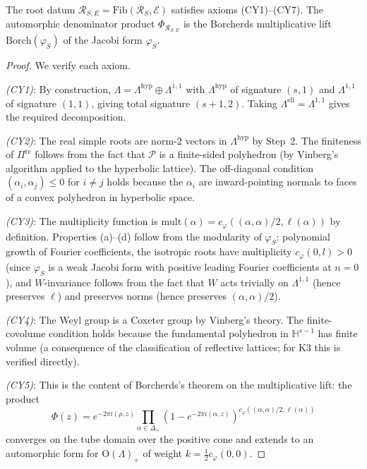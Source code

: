 \begin{theorem}
\label{thm:fibration-cy3}

The root datum $\mathcal{R}_{S,E} = \mathrm{Fib}(\mathcal{R}_S, \mathcal{E})$ satisfies axioms (CY1)--(CY7). The automorphic denominator product $\Phi_{\mathcal{R}_{S,E}}$ is the Borcherds multiplicative lift $\mathrm{Borch}(\varphi_S)$ of the Jacobi form $\varphi_S$.
\end{theorem}

\begin{proof}
We verify each axiom.

\emph{(CY1)}: By construction, $\Lambda = \Lambda^{\mathrm{hyp}} \oplus \Lambda^{1,1}$ with $\Lambda^{\mathrm{hyp}}$ of signature $(s,1)$ and $\Lambda^{1,1}$ of signature $(1,1)$, giving total signature $(s+1, 2)$. Taking $\Lambda^{\mathrm{ell}} = \Lambda^{1,1}$ gives the required decomposition.

\emph{(CY2)}: The real simple roots are norm-$2$ vectors in $\Lambda^{\mathrm{hyp}}$ by Step~2. The finiteness of $\Pi^{\mathrm{re}}$ follows from the fact that $\mathcal{P}$ is a finite-sided polyhedron (by Vinberg's algorithm applied to the hyperbolic lattice). The off-diagonal condition $(\alpha_i, \alpha_j) \leq 0$ for $i \neq j$ holds because the $\alpha_i$ are inward-pointing normals to faces of a convex polyhedron in hyperbolic space.

\emph{(CY3)}: The multiplicity function is $\mathrm{mult}(\alpha) = c_\varphi((\alpha,\alpha)/2, \ell(\alpha))$ by definition. Properties (a)--(d) follow from the modularity of $\varphi_S$: polynomial growth of Fourier coefficients, the isotropic roots have multiplicity $c_\varphi(0, l) > 0$ (since $\varphi_S$ is a weak Jacobi form with positive leading Fourier coefficients at $n = 0$), and $W$-invariance follows from the fact that $W$ acts trivially on $\Lambda^{1,1}$ (hence preserves $\ell$) and preserves norms (hence preserves $(\alpha,\alpha)/2$).

\emph{(CY4)}: The Weyl group is a Coxeter group by Vinberg's theory. The finite-covolume condition holds because the fundamental polyhedron in $\mathbb{H}^{s-1}$ has finite volume (a consequence of the classification of reflective lattices; for K3 this is verified directly).

\emph{(CY5)}: This is the content of Borcherds's theorem on the multiplicative lift: the product
\[
 \Phi(z) = e^{-2\pi i (\rho, z)} \prod_{\alpha \in \Delta_+} (1 - e^{-2\pi i(\alpha, z)})^{c_\varphi((\alpha,\alpha)/2, \ell(\alpha))}
\]
converges on the tube domain over the positive cone and extends to an automorphic form for $\mathrm{O}(\Lambda)_+$ of weight $k = \frac{1}{2}c_\varphi(0,0)$.


\end{proof}
